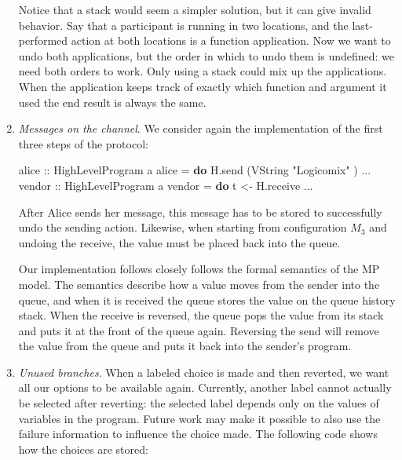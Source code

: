 \documentclass[runningheads,plain]{llncs}
\newcommand{\checkthis}[1]{#1}
\newenvironment{Shaded}{}{}
\newcommand{\KeywordTok}[1]{\textcolor[rgb]{0.00,0.44,0.13}{\textbf{#1}}}
\newcommand{\DataTypeTok}[1]{\textcolor[rgb]{0.56,0.13,0.00}{#1}}
\newcommand{\StringTok}[1]{\textcolor[rgb]{0.25,0.44,0.63}{#1}}
\newcommand{\OtherTok}[1]{\textcolor[rgb]{0.00,0.44,0.13}{#1}}
\newcommand{\FunctionTok}[1]{\textcolor[rgb]{0.02,0.16,0.49}{#1}}
\newcommand{\NormalTok}[1]{#1}
\begin{document}
\begin{enumerate}[1.]
 Notice that a stack would seem a simpler solution, but it
  can give invalid behavior. Say that a participant is running in two
  locations, and the last-performed action at both locations is a
  function application. Now we want to undo both applications, but the
  order in which to undo them is undefined: we need both orders to work.
  Only using a stack could mix up the applications. When the application
  keeps track of exactly which function and argument it used the end
  result is always the same.  \\
  
\item \emph{Messages on the channel}.
    We consider again the implementation of the first three steps of the protocol:

\begin{Shaded}
\begin{Highlighting}[]
\OtherTok{alice ::} \DataTypeTok{HighLevelProgram}\NormalTok{ a}
\NormalTok{alice }\FunctionTok{=} \KeywordTok{do} 
\NormalTok{    H.send (}\DataTypeTok{VString} \StringTok{"Logicomix"}\NormalTok{ )}
    \FunctionTok{...}
\OtherTok{vendor ::} \DataTypeTok{HighLevelProgram}\NormalTok{ a}
\NormalTok{vendor }\FunctionTok{=} \KeywordTok{do} 
\NormalTok{    t }\OtherTok{<-}\NormalTok{ H.receive }
    \FunctionTok{...}
\end{Highlighting}
\end{Shaded}

  After Alice sends her message, this message has to be stored to successfully undo the sending action.
  Likewise, when starting from configuration $M_3$ and undoing the receive,
  the value must be placed back into the queue. 

  Our implementation follows closely follows the formal semantics of the MP model. 
  The semantics describe how a value moves from the sender into the
  queue, and when it is received the queue stores the value on the queue
  history stack. \checkthis{When the receive is reversed}, the queue pops the value
  from its stack and puts it at the front of the queue again. Reversing
  the send will remove the value from the queue and puts it back into
  the sender's program. \\
  
\item \emph{Unused branches}.
  When a labeled choice is made and then reverted, we want all our options to be
  available again. Currently, another label cannot actually be selected
  after reverting: the selected label depends only on the values of
  variables in the program. Future work may make it possible to also use
  the failure information to influence the choice made.
   The following code shows how the choices are stored:


\end{enumerate}
\end{document}
